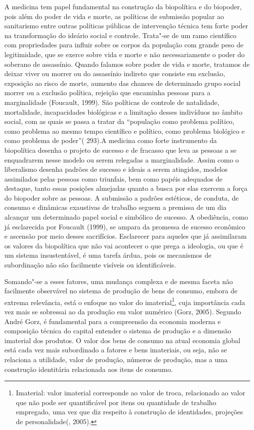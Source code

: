 A medicina tem papel fundamental na construção da biopolítica e do
biopoder, pois além do poder de vida e morte, as políticas de submissão
popular ao sanitarismo entre outras políticas públicas de intervenção
técnica tem forte poder na transformação do ideário social e controle.
Trata"-se de um ramo científico com propriedades para influir sobre os
corpos da população com grande peso de legitimidade, que se exerce sobre
vida e morte e não necessariamente o poder do soberano de assassínio.
Quando falamos sobre poder de vida e morte, tratamos de deixar viver ou
morrer ou do assassínio indireto que consiste em exclusão, exposição ao
risco de morte, aumento das chances de determinado grupo social morrer
ou a exclusão política, rejeição que encaminha pessoas para a
marginalidade (Foucault, 1999). São políticas de controle de natalidade,
mortalidade, incapacidades biológicas e a limitação desses indivíduos no
âmbito social, com as quais se passa a tratar da ``população como
problema político, como problema ao mesmo tempo científico e político,
como problema biológico e como problema de poder''( 293).A medicina como
forte instrumento da biopolítica desenha o projeto de sucesso e de
fracasso que leva as pessoas a se enquadrarem nesse modelo ou serem
relegadas a marginalidade. Assim como o liberalismo desenha padrões de
sucesso e ideais a serem atingidos, modelos assimilados pelas pessoas
como triunfais, bem como papéis adequados de destaque, tanto essas
posições almejadas quanto a busca por elas exercem a força do biopoder
sobre as pessoas. A submissão a padrões estéticos, de conduta, de
consumo e dinâmicas exaustivas de trabalho seguem a premissa de um dia
alcançar um determinado papel social e simbólico de sucesso. A
obediência, como já esclarecida por Foucault (1999), se ampara da promessa
de sucesso econômico e ascensão por meio desses sacrifícios. Esclarecer
para aqueles que já assimilaram os valores da biopolítica que não vai
acontecer o que prega a ideologia, ou que é um sistema insustentável, é
uma tarefa árdua, pois os mecanismos de subordinação não são facilmente
visíveis ou identificáveis.

Somando"-se a esses fatores, uma mudança complexa e de mesma faceta não
facilmente observável no sistema de produção de bens de consumo, embora
de extrema relevância, está o enfoque no valor do imaterial\footnote{Imaterial:
  valor imaterial corresponde ao valor de troca, relacionado ao valor
  que não pode ser quantificável por itens ou quantidade de trabalho
  empregado, uma vez que diz respeito à construção de identidades,
  projeções de personalidade(, 2005).}, cuja importância cada vez
mais se sobressai ao da produção em valor numérico (Gorz, 2005). Segundo
André Gorz, é fundamental para a compreensão da economia moderna e
composição técnica do capital entender o sistema de produção e a
dimensão imaterial dos produtos. O valor dos bens de consumo na atual
economia global está cada vez mais subordinado a fatores e bens
imateriais, ou seja, não se relaciona a utilidade, valor de produção,
números de produção, mas a uma construção identitária relacionada aos
itens de consumo.

